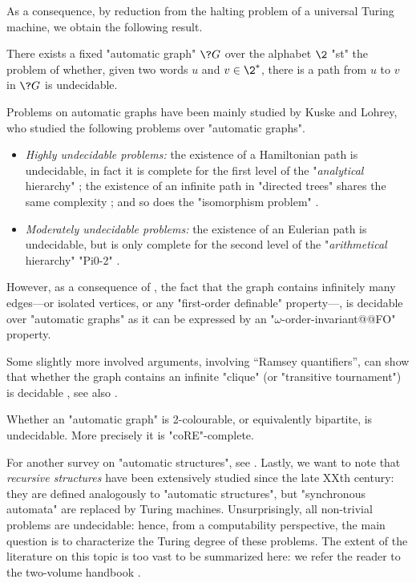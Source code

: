 As a consequence, by reduction from the halting problem of a universal Turing machine, 
we obtain the following result.
\begin{proposition}
	There exists a fixed "automatic graph" $\?G$ over the alphabet $\2$ "st"
	the problem of whether, given two words $u$ and $v \in \2^*$, there is a path from
	$u$ to $v$ in $\?G$ is undecidable.
\end{proposition}

Problems on automatic graphs have been mainly studied by Kuske and Lohrey, who studied the following problems over "automatic graphs".
\begin{itemize}
	\item \emph{Highly undecidable problems:} the existence of a Hamiltonian path
		is undecidable, in fact it is complete for the first level of the "\emph{analytical} hierarchy"
		\cite[Theorem~3.2]{KuskeLohrey2010AutomaticGraphs};
		the existence of an infinite path in "directed trees" shares the same complexity
		\cite[Theorem~3.6]{KuskeLohrey2010AutomaticGraphs};
		and so does the "isomorphism problem" \cite[Theorem~5.9]{KhoussainovNiesRubinStephan2007Automatic}.
	\item \emph{Moderately undecidable problems:}
		the existence of an Eulerian path is undecidable, but is only complete for
		the second level of the "\emph{arithmetical} hierarchy" "Pi0-2" \cite[Theorem~4.13]{KuskeLohrey2010AutomaticGraphs}.
\end{itemize}

However, as a consequence of , the 
fact that the graph contains infinitely many edges---or isolated vertices, or any "first-order
definable" property---, is decidable over "automatic graphs" 
as it can be expressed by an "$\omega$-order-invariant@@FO" property.

Some slightly more involved arguments, involving ``Ramsey quantifiers'',
can show that whether the graph contains an infinite "clique" (or "transitive tournament")
is decidable \cite[Corollary~5.5]{KuskeLohrey2010AutomaticGraphs}, 
see also \cite[Theorem~3.20]{Rubin2008AutomataPresentingStructures}.

\begin{proposition}
	Whether an "automatic graph" is 2-colourable, or equivalently bipartite, is undecidable.
	More precisely it is "coRE"-complete.
\end{proposition}

For another survey on "automatic structures", see \cite{Gradel2020AutomaticStructures}.
Lastly, we want to note that \emph{recursive structures} have been extensively studied
since the late XXth century: they are defined analogously to "automatic structures",
but "synchronous automata" are replaced by Turing machines.
Unsurprisingly, all non-trivial problems are undecidable: hence, from a computability perspective,
the main question is to characterize the Turing degree of these problems.
The extent of the literature on this topic is too vast to be summarized here:
we refer the reader to the two-volume handbook \cite{ErshovGoncharovNerodeRemmelMarek1998Handbook1,ErshovGoncharovNerodeRemmelMarek1998Handbook2}.